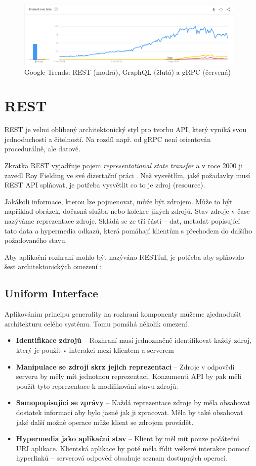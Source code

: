 \documentclass[thesis=M,czech]{FITthesis}[2019/12/23]
\begin{document}
\begin{figure}[h]
    \includegraphics[width=\linewidth]{img/interest_trend.png}
    \caption{Google Trends: REST (modrá), GraphQL (žlutá) a gRPC (červená)}
	\label{google_trends_img}
\end{figure}

\section{REST}
REST je velmi oblíbený architektonický styl pro tvorbu API, který vyniká svou jednoduchostí a čitelností. Na rozdíl např. od gRPC není orientován procedurálně, ale datově.

Zkratka REST vyjadřuje pojem \textit{representational state transfer} a v roce 2000 ji zavedl Roy Fielding ve své dizertační práci \cite{fielding00}. Než vysvětlím, jaké požadavky musí REST API splňovat, je potřeba vysvětlit co to je zdroj (resource).

Jakákoli informace, kterou lze pojmenovat, může být zdrojem. Může to být například obrázek, dočasná služba nebo kolekce jiných zdrojů. Stav zdroje v čase nazýváme reprezentace zdroje. Skládá se ze tří částí -- dat, metadat popisující tato data a hypermedia odkazů, která pomáhají klientům s přechodem do dalšího požadovaného stavu.

Aby aplikační rozhraní mohlo být nazýváno RESTful, je potřeba aby splňovalo šest architektonických omezení \cite{restful_api}:

\subsection{Uniform Interface}
Aplikováním principu generality na rozhraní komponenty můžeme zjednodušit architekturu celého systému. Tomu pomáhá několik omezení.
\begin{itemize}
    \item \textbf{Identifikace zdrojů} -- Rozhraní musí jednoznačně identifikovat každý zdroj, který je použit v interakci mezi klientem a serverem
    \item \textbf{Manipulace se zdroji skrz jejich reprezentaci} -- Zdroje v odpovědi serveru by měly mít jednotnou reprezentaci. Konzumenti API by pak měli použít tyto reprezentace k modifikování stavu zdrojů.
    \item \textbf{Samopopisující se zprávy} -- Každá reprezentace zdroje by měla obsahovat dostatek informací aby bylo jasné jak ji zpracovat. Měla by také obsahovat jaké další možné operace může klient se zdrojem provádět.
    \item \textbf{Hypermedia jako aplikační stav} -- Klient by měl mít pouze počáteční URI aplikace. Klientská aplikace by poté měla řídit veškeré interakce pomocí hyperlinků -- serverová odpověď obsahuje seznam dostupných operací.
\end{itemize}
\end{document}
